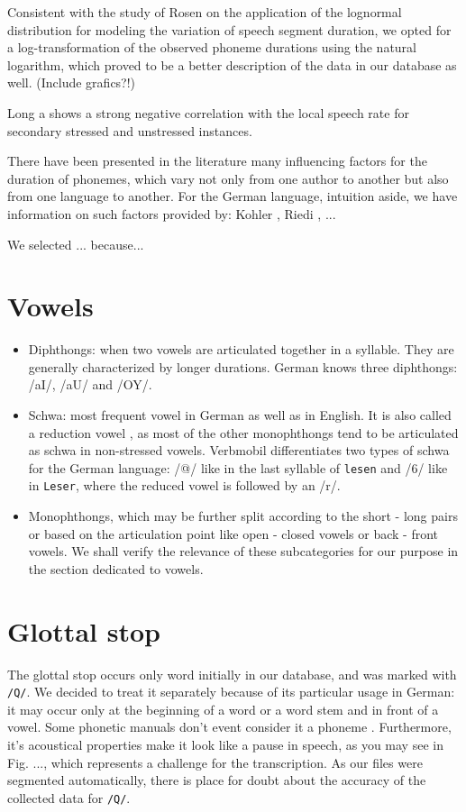 \documentclass[a4paper]{scrreprt}
\begin{document}
Consistent with the study of Rosen \cite{Rosen2005} on the application of the lognormal distribution for modeling the variation of speech segment duration, we opted for a log-transformation of the observed phoneme durations using the natural logarithm, which proved to be a better description of the data in our database as well. (Include grafics?!)

Long a shows a strong negative correlation with the local speech rate for secondary stressed and unstressed instances.

There have been presented in the literature many influencing factors for the duration of phonemes, which vary not only from one author to another but also from one language to another. For the German language, intuition aside, we have information on such factors provided by: Kohler \cite{Kohler1992}, Riedi \cite{Riedi1995}, ...

We selected ... because...

\section{Vowels}
\begin{itemize}
	\item Diphthongs: when two vowels are articulated together in a syllable. They are generally characterized by longer durations. German knows three diphthongs: /aI/, /aU/ and /OY/.
	\item Schwa: most frequent vowel in German as well as in English. It is also called a reduction vowel \cite{Kohler1995}, as most of the other monophthongs tend to be articulated as schwa in non-stressed vowels. Verbmobil differentiates two types of schwa for the German language: /@/ like in the last syllable of \texttt{lesen} and /6/ like in \texttt{Leser}, where the reduced vowel is followed by an /r/.
	\item Monophthongs, which may be further split according to the short - long pairs or based on the articulation point like open - closed vowels or back - front vowels. We shall verify the relevance of these subcategories for our purpose in the section dedicated to vowels.
\end{itemize}

\section{Glottal stop}
The glottal stop occurs only word initially in our database, and was marked with \texttt{/Q/}. We decided to treat it separately because of its particular usage in German: it may occur only at the beginning of a word or a word stem and in front of a vowel. Some phonetic manuals don't event consider it a phoneme \cite{Ternes2012}. Furthermore, it's acoustical properties make it look like a pause in speech, as you may see in Fig. ..., which represents a challenge for the transcription. As our files were segmented automatically, there is place for doubt about the accuracy of the collected data for \texttt{/Q/}.
\end{document}
